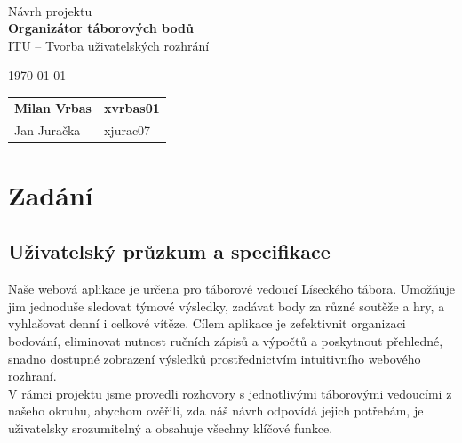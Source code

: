 \documentclass[a4paper, 12pt]{article} %
\begin{document}
\begin{titlepage}
    \begin{center}
         \\
        \Huge{Návrh projektu} \\
        \Large{\textbf{Organizátor táborových bodů }} \\
        \large{ITU – Tvorba uživatelských rozhrání }
    \end{center}

    {\large \today \hfill
        \large
        \begin{tabular}{l l}
        \textbf{Milan Vrbas} & \quad \textbf{xvrbas01}\\
        Jan Juračka           & \quad xjurac07      \\
        \end{tabular}
        }
\end{titlepage}

\tableofcontents
\thispagestyle{empty}
\newpage

\section{Zadání}
\subsection{Uživatelský průzkum a specifikace}
Naše webová aplikace je určena pro táborové vedoucí Líseckého tábora. Umožňuje jim jednoduše 
sledovat týmové výsledky, zadávat body za různé soutěže a hry, a vyhlašovat denní i celkové 
vítěze. Cílem aplikace je zefektivnit organizaci bodování, eliminovat nutnost ručních zápisů 
a výpočtů a poskytnout přehledné, snadno dostupné zobrazení výsledků prostřednictvím 
intuitivního webového rozhraní. \\
V rámci projektu jsme provedli rozhovory s jednotlivými táborovými vedoucími z našeho okruhu, 
abychom ověřili, zda náš návrh odpovídá jejich potřebám, je uživatelsky srozumitelný a 
obsahuje všechny klíčové funkce.
\end{document}
